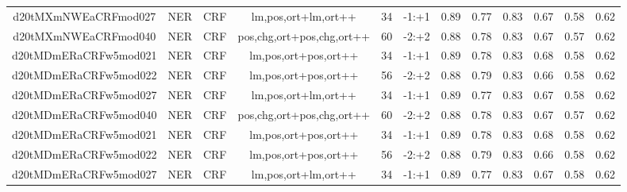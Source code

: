 \documentclass[a4paper]{article}
\begin{document}
\begin{landscape}
\begin{center}
\begin{tabular}{ |c|c|c|c|c|c|c|c|c|c|c|c|}
 	
 
 	
 		
 		\small{ d20tMXmNWEaCRFmod027 } & NER & CRF & lm,pos,ort+lm,ort++  &  34 &  -1:+1  &  0.89 & 0.77 & 0.83  &  0.67 & 0.58 & 0.62 \\
 		

 	
 
 	
 		
 		\small{ d20tMXmNWEaCRFmod040 } & NER & CRF & pos,chg,ort+pos,chg,ort++  &  60 &  -2:+2  &  0.88 & 0.78 & 0.83  &  0.67 & 0.57 & 0.62 \\
 		

 	
 
 	
 		
 		\small{ d20tMDmERaCRFw5mod021 } & NER & CRF & lm,pos,ort+pos,ort++  &  34 &  -1:+1  &  0.89 & 0.78 & 0.83  &  0.68 & 0.58 & 0.62 \\
 		

 	
 
 	
 		
 		\small{ d20tMDmERaCRFw5mod022 } & NER & CRF & lm,pos,ort+pos,ort++  &  56 &  -2:+2  &  0.88 & 0.79 & 0.83  &  0.66 & 0.58 & 0.62 \\
 		

 	
 
 	
 		
 		\small{ d20tMDmERaCRFw5mod027 } & NER & CRF & lm,pos,ort+lm,ort++  &  34 &  -1:+1  &  0.89 & 0.77 & 0.83  &  0.67 & 0.58 & 0.62 \\
 		

 	
 
 	
 		
 		\small{ d20tMDmERaCRFw5mod040 } & NER & CRF & pos,chg,ort+pos,chg,ort++  &  60 &  -2:+2  &  0.88 & 0.78 & 0.83  &  0.67 & 0.57 & 0.62 \\
 		

 	
 
 	
 		
 		\small{ d20tMDmERaCRFw5mod021 } & NER & CRF & lm,pos,ort+pos,ort++  &  34 &  -1:+1  &  0.89 & 0.78 & 0.83  &  0.68 & 0.58 & 0.62 \\
 		

 	
 
 	
 		
 		\small{ d20tMDmERaCRFw5mod022 } & NER & CRF & lm,pos,ort+pos,ort++  &  56 &  -2:+2  &  0.88 & 0.79 & 0.83  &  0.66 & 0.58 & 0.62 \\
 		

 	
 
 	
 		
 		\small{ d20tMDmERaCRFw5mod027 } & NER & CRF & lm,pos,ort+lm,ort++  &  34 &  -1:+1  &  0.89 & 0.77 & 0.83  &  0.67 & 0.58 & 0.62 \\
 		


\end{tabular}
\end{center}
\end{landscape}
\end{document}
